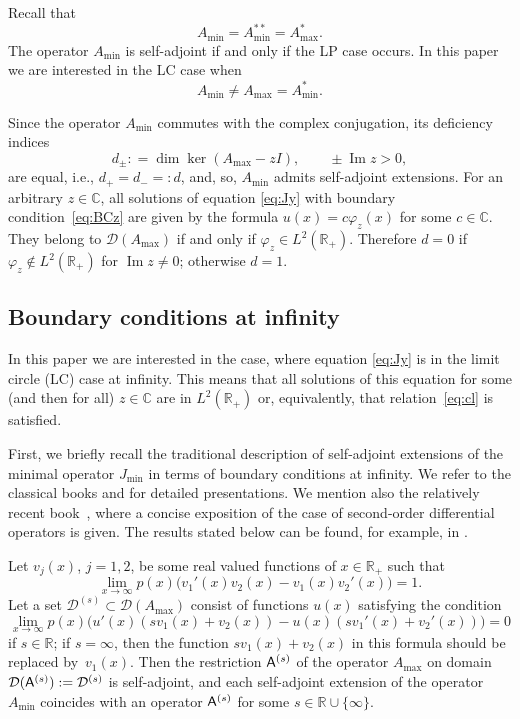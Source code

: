 \documentclass[10pt,a4paper]{amsart}
\numberwithin{equation}{section}
\begin{document}
 Recall that
\[
 A_{\min}= A_{\min}^{**} = A_{\max}^{*}.
 \]
 The operator $A_{\min}$ is self-adjoint if and only if the LP case occurs.
 In this paper we are interested in the LC case when
 \begin{equation}
 A_{\min}\neq A_{\max}=A_{\min}^*.
 \label{eq:cl}\end{equation}

Since the operator $A_{\min} $ commutes with the complex conjugation, its deficiency indices
 \[
 d_{\pm}: =\dim\ker (A_{\max}-z I),\qquad \pm \operatorname{Im} z>0,
 \]
 are equal, i.e., $d_{+} =d_{-}=:d $, and, so, $A_{\min} $ admits self-adjoint extensions. For an arbitrary $z\in{\mathbb C}$, all solutions of equation \eqref{eq:Jy} with boundary condition~\eqref{eq:BCz}
 are given by the formula $u (x)= c \varphi_{z}(x)$ for some $c\in{\mathbb C}$. They belong to $ {\mathcal D} (A_{\max})$ if and only if $\varphi_{z} \in L^2 ({\mathbb R}_{+})$. Therefore $d=0$ if $\varphi_{z} \not\in L^2 ({\mathbb R}_{+})$ for $\operatorname{Im} z\neq 0$; otherwise $d=1$.

\subsection{Boundary conditions at infinity}\label{section2.3}

 In this paper we are interested in the case, where equation \eqref{eq:Jy} is in the limit circle (LC) case at infinity. This means that all solutions of this equation for some (and then for all) $z\in{\mathbb C}$ are in $L^2({\mathbb R}_{+})$ or, equivalently, that relation~\eqref{eq:cl} is satisfied.

First, we briefly recall the traditional description of self-adjoint extensions of the minimal operator $J_{\min}$ in terms of boundary conditions at infinity.
 We refer to the classical books \cite[Chapter~IX, Section~4]{CoLe} and \cite[Section~18]{Nai} for detailed presentations. We mention also the relatively recent book~\cite{Schm}, where a concise exposition of the case of second-order differential operators is given. The results stated below can be found, for example, in \cite[Proposition~15.14]{Schm}.

 Let $v_{j}(x)$, $j=1,2$, be some real valued functions of $x\in{\mathbb R}_{+}$ such that
 \begin{equation}
 \lim_{x\to\infty} p(x) \big(v_{1}'(x) v_2 (x)- v_{1}(x) v_{2}'(x)\big)=1.
 \label{eq:bc1}\end{equation}
 Let a set ${\mathcal D}^{(s)} \subset {\mathcal D} ( A_{\max})$ consist of functions $u(x)$ satisfying the condition
 \begin{equation}
 \lim_{x\to\infty} p(x) \big(u'(x) (s v_{1}(x) + v_{2}(x))- u(x) (s v_{1}'(x) + v_{2}'(x))\big)=0
 \label{eq:bc}\end{equation}
 if $s\in{\mathbb R}$; if $s=\infty $, then the function $s v_{1}(x) + v_{2}(x)$ in this formula should be replaced by~$v_{1} (x)$.
 Then the restriction ${\sf A}^{(s)}$ of the operator $ A_{\max}$ on domain $ {\mathcal D} ({\sf A}^{(s)}):= {\mathcal D}^{(s)} $ is self-adjoint, and each self-adjoint extension of the operator $ A_{\min}$ coincides with an operator
 ${\sf A}^{(s)}$ for some $s\in{\mathbb R}\cup\{\infty\}$.
\end{document}
